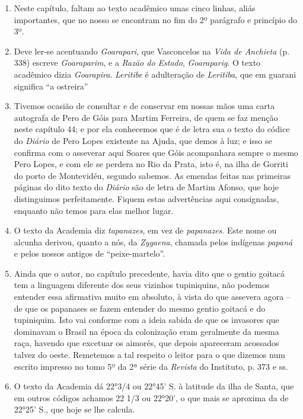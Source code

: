 \begin{enumerate}
\item Neste capítulo, faltam ao texto acadêmico umas cinco linhas, aliás importantes, que 
no nosso se encontram no fim do 2º parágrafo e princípio do 3º.

\item  Deve ler-se acentuando \textit{Goarapari}, que Vasconcelos na \textit{Vida de Anchieta} 
(p. 338) escreve \textit{Goaraparim}, e a \textit{Razão do Estado}, \textit{Goaraparig}. O
texto acadêmico dizia \textit{Goarapira}. \textit{Leritibe} é adulteração de \textit{Leritiba}, que
em guarani significa ``a ostreira''

\item Tivemos ocasião de consultar e de conservar em nossas mãos uma carta autografa de 
Pero de Góis para Martim Ferreira, de quem se faz menção neste capítulo 44; e por ela 
conhecemos que é de letra sua o texto do códice do \textit{Diário} de Pero Lopes existente na 
Ajuda, que demos à luz; e isso se confirma com o asseverar aqui Soares que Góis 
acompanhara sempre o mesmo Pero Lopes, e com ele se perdera no Rio da Prata, isto é, 
na ilha de Gorriti do porto de Montevidéu, segundo sabemos. As emendas feitas nas 
primeiras páginas do dito texto do \textit{Diário} são de letra de Martim Afonso, que hoje 
distinguimos perfeitamente. Fiquem estas advertências aqui consignadas,  enquanto 
não temos para elas melhor lugar.

\item O texto da Academia diz \textit{tapanazes}, em vez de \textit{papanazes}. Este nome ou alcunha 
derivou, quanto a nós, da \textit{Zygaena}, chamada pelos indígenas \textit{papaná} e pelos nossos 
antigos de ``peixe-martelo''.

\item  Ainda que o autor, no capítulo precedente, havia dito que o gentio goitacá tem a 
linguagem diferente dos seus vizinhos tupiniquins, não podemos entender essa afirmativa 
muito em absoluto, à vista do que assevera agora -- de que os papanases se fazem entender 
do mesmo gentio goitacá e do tupiniquim. Isto vai conforme com a ideia sabida de que os 
invasores que dominavam o Brasil na época da colonização eram geralmente da mesma raça, 
havendo que excetuar os aimorés, que depois apareceram acossados talvez do oeste. 
Remetemos a tal respeito o leitor para o que dizemos num escrito impresso no tomo 5º da 2ª 
série da \textit{Revista} do Instituto, p. 373 e ss.

\item O texto da Academia dá 22°3/4 ou 22°45' S. à latitude da ilha de Santa, que em 
outros códigos achamos 22 1/3 ou 22°20', o que mais se aproxima da de 22°25' S., que 
hoje se lhe calcula.


\end{enumerate}
